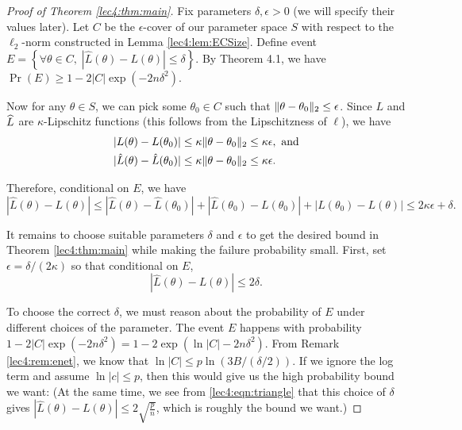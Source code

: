 \begin{proof}[Proof of Theorem \ref{lec4:thm:main}]
Fix parameters $\delta, \epsilon>0$ (we will specify their values later). Let $C$ be the $\epsilon$-cover of our parameter space $S$ with respect to the $\ell_2$-norm constructed in Lemma \ref{lec4:lem:ECSize}. Define event $E = \left\{ \forall \theta \in C, \; |\hat L(\theta) - L(\theta)| \le \delta \right\}$. By Theorem 4.1, we have $\Pr (E) \ge 1 - 2|C|\exp(-2n\delta^2)$.

Now for any $\theta \in S$, we can pick some $\theta_0 \in C$ such that $\|\theta-\theta_0\|_2 \le \epsilon$. Since $L$ and $\widehat{L}$ are $\kappa$-Lipschitz functions (this follows from the Lipschitzness of $\ell$), we have
\begin{align}
|L(\theta) - L(\theta_0)| &\le \kappa \|\theta-\theta_0\|_2 \le \kappa \epsilon, \text{ and} \\
|\hat L(\theta) - \hat L(\theta_0)| &\le \kappa \|\theta-\theta_0\|_2 \le \kappa \epsilon.
\end{align}

Therefore, conditional on $E$, we have
\begin{equation}
    |\hat L(\theta) -  L(\theta)| \le |\hat L(\theta)-\hat L(\theta_0)| + |\hat L(\theta_0) -  L(\theta_0)| + | L(\theta_0) - L(\theta)| \le 2 \kappa\epsilon+\delta.
\end{equation}

It remains to choose suitable parameters $\delta$ and $\epsilon$ to get the desired bound in Theorem \ref{lec4:thm:main} while making the failure probability small. First, set $\epsilon = \delta / (2 \kappa)$ so that conditional on $E$,
\begin{equation} \label{lec4:eqn:triangle}
    |\hat L(\theta) -  L(\theta)| \le 2\delta.
\end{equation}

To choose the correct $\delta$, we must reason about the probability of $E$ under different choices of the parameter. The event $E$ happens with probability $1 - 2|C|\exp(-2n\delta^2) = 1 - 2 \exp(\ln{|C|} - 2n\delta^2)$. From Remark \ref{lec4:rem:enet}, we know that $\ln{|C|} \leq p \ln{ (3B / (\delta / 2)) }$. If we ignore the log term and assume $\ln{|c|} \leq p$, then this would give us the high probability bound we want:
(At the same time, we see from \eqref{lec4:eqn:triangle} that this choice of $\delta$ gives $|\hat L(\theta)- L(\theta)| \le 2 \sqrt{\frac{p}{n}}$, which is roughly the bound we want.)


\end{proof}
